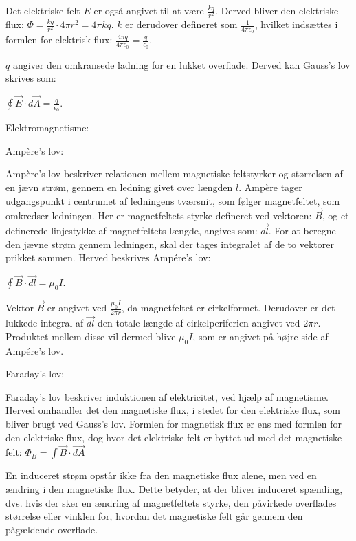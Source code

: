 Det elektriske felt $E$ er også angivet til at være $\frac{kq}{r^2}$. Derved bliver den elektriske flux: $\Phi = \frac{kq}{r^2} \cdot 4 \pi r^2 = 4 \pi k q$. $k$ er derudover defineret som $\frac{1}{4 \pi \epsilon_0}$, hvilket indsættes i formlen for elektrisk flux: $\frac{4 \pi q}{4 \pi \epsilon_0} = \frac{q}{\epsilon_0}$.

$q$ angiver den omkransede ladning for en lukket overflade. Derved kan Gauss's lov skrives som:

\centerline{$\oint \vec{E} \cdot d \vec{A} = \frac{q}{\epsilon_0}$. \cite[Kap. 21]{fysikbog}}

Elektromagnetisme:

Ampère's lov:

Ampère's lov beskriver relationen mellem magnetiske feltstyrker og størrelsen af en jævn strøm, gennem en ledning givet over længden $l$. Ampère tager udgangspunkt i centrumet af ledningens tværsnit, som følger magnetfeltet, som omkredser ledningen. Her er magnetfeltets styrke defineret ved vektoren: $\vec{B}$, og et definerede linjestykke af magnetfeltets længde, angives som: $\vec{dl}$. For at beregne den jævne strøm gennem ledningen, skal der tages integralet af de to vektorer prikket sammen. Herved beskrives Ampére's lov:

\centerline{$\oint \vec{B} \cdot \vec{dl} = \mu_0 I$. \cite{fysikbog}}

Vektor $\vec{B}$ er angivet ved $\frac{\mu_0 I}{2 \pi r}$, da magnetfeltet er cirkelformet. Derudover er det lukkede integral af $\vec{dl}$ den totale længde af cirkelperiferien angivet ved $2 \pi r$. Produktet mellem disse vil dermed blive $\mu_0 I$, som er angivet på højre side af Ampére's lov.

Faraday's lov:

Faraday's lov beskriver induktionen af elektricitet, ved hjælp af magnetisme. Herved omhandler det den magnetiske flux, i stedet for den elektriske flux, som bliver brugt ved Gauss's lov. Formlen for magnetisk flux er ens med formlen for den elektriske flux, dog hvor det elektriske felt er byttet ud med det magnetiske felt: $\Phi_B = \int \vec{B} \cdot \vec{dA}$

En induceret strøm opstår ikke fra den magnetiske flux alene, men ved en ændring i den magnetiske flux. Dette betyder, at der bliver induceret spænding, dvs. hvis der sker en ændring af magnetfeltets styrke, den påvirkede overflades størrelse eller vinklen for, hvordan det magnetiske felt går gennem den pågældende overflade.

